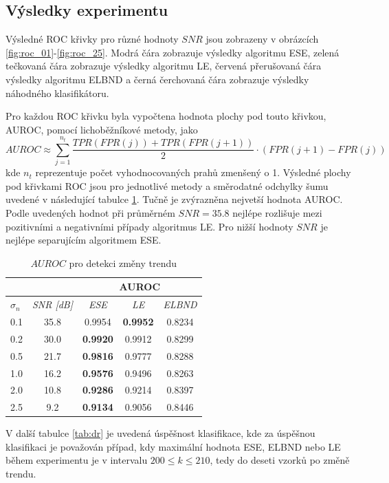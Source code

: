 \subsection{Výsledky experimentu}
Výsledné ROC křivky pro různé hodnoty $SNR$ jsou zobrazeny v obrázcích \ref{fig:roc_01}-\ref{fig:roc_25}. Modrá čára zobrazuje výsledky algoritmu ESE, zelená tečkovaná čára zobrazuje výsledky algoritmu LE, červená přerušovaná čára výsledky algoritmu ELBND a černá čerchovaná čára zobrazuje výsledky náhodného klasifikátoru. 
\par 
Pro každou ROC křivku byla vypočtena hodnota plochy pod touto křivkou, AUROC, pomocí lichoběžníkové metody, jako
\begin{equation}
AUROC \approx \sum_{j=1}^{n_t} \frac{TPR(FPR(j))+TPR(FPR(j+1))}{2} \cdot(FPR(j+1)-FPR(j))
\end{equation}
kde $n_t$ reprezentuje počet vyhodnocovaných prahů zmenšený o 1. Výsledné plochy pod křivkami ROC jsou pro jednotlivé metody a směrodatné odchylky šumu uvedené v následující tabulce \ref{tab:auroc}. Tučně je zvýrazněna nejvetší hodnota AUROC. Podle uvedených hodnot při průměrném $SNR=35.8$ nejlépe rozlišuje mezi pozitivními a negativními případy algoritmus LE. Pro nižší hodnoty $SNR$ je nejlépe separujícím algoritmem ESE.
\begin{table}[h!]

\caption{$AUROC$ pro detekci změny trendu}
\centering
\begin{tabular}{|l|c|c|c|c|}
\hline
\multicolumn{2}{|l|}{} & \multicolumn{3}{c|}{\textbf{AUROC}} \\ \hline
$\sigma_n$ & \textit{SNR [dB]} & \textit{ESE} & \textit{LE} & \textit{ELBND} \\ \hline
0.1 & 35.8 & 0.9954 & \textbf{0.9952} & 0.8234\\ \hline
0.2 & 30.0 & \textbf{0.9920} & 0.9912 & 0.8299 \\ \hline
0.5 & 21.7 & \textbf{0.9816} & 0.9777 & 0.8288 \\ \hline
1.0 & 16.2 & \textbf{0.9576} & 0.9496 & 0.8263 \\ \hline
2.0 & 10.8 & \textbf{0.9286} & 0.9214 & 0.8397 \\ \hline
2.5 & 9.2 & \textbf{0.9134} & 0.9056 & 0.8446 \\ \hline
\end{tabular}
\label{tab:auroc}
\end{table}
V další tabulce \ref{tab:dr} je uvedená úspěšnost klasifikace, kde za úspěšnou klasifikaci je považován případ, kdy maximální hodnota ESE, ELBND nebo LE během experimentu je v intervalu $200\leq k\leq210$, tedy do deseti vzorků po změně trendu.
